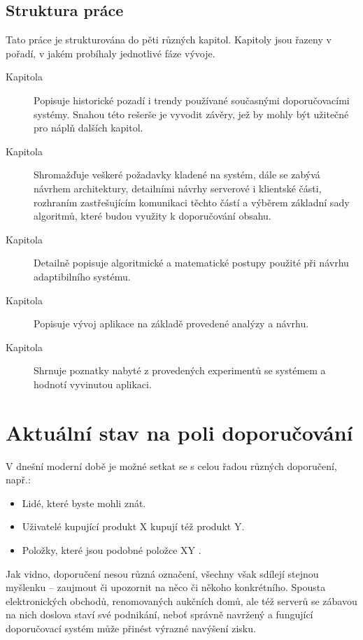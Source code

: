 \documentclass[thesis=M,czech]{FITthesis}[2014/05/07]
\begin{document}
\begin{introduction}
\section{Struktura práce}
\label{sec:structure}
	Tato práce je strukturována do pěti různých kapitol. Kapitoly jsou řazeny v pořadí, v jakém probíhaly jednotlivé fáze vývoje.	

\begin{description}
  \item[Kapitola ] Popisuje historické pozadí i trendy používané současnými doporučovacími systémy. Snahou této rešerše je vyvodit závěry, jež by mohly být užitečné pro náplň dalších kapitol.
  \item[Kapitola ] Shromažďuje veškeré požadavky kladené na systém, dále se zabývá návrhem architektury, detailními návrhy serverové i klientské části, rozhraním zastřešujícím komunikaci těchto částí a výběrem základní sady algoritmů, které budou využity k doporučování obsahu. 
  \item[Kapitola ] Detailně popisuje algoritmické a matematické postupy použité při návrhu adaptibilního systému. 
  \item[Kapitola ] Popisuje vývoj aplikace na základě provedené analýzy a návrhu.
  \item[Kapitola ] Shrnuje poznatky nabyté z provedených experimentů se systémem a hodnotí vyvinutou aplikaci. 
\end{description}
	
\end{introduction}
	
\chapter{Aktuální stav na poli doporučování}	
\label{chap:current}

V dnešní moderní době je možné setkat se s celou řadou různých doporučení, např.: 

\begin{itemize}
	\item Lidé, které byste mohli znát.
	\item Uživatelé kupující produkt X kupují též produkt Y.
	\item Položky, které jsou podobné položce XY	.
\end{itemize}

Jak vidno, doporučení nesou různá označení, všechny však sdílejí stejnou myšlenku – zaujmout či upozornit na něco či někoho konkrétního. Spousta elektronických obchodů, renomovaných aukčních domů, ale též serverů se zábavou na nich doslova staví své podnikání, neboť správně navržený a fungující doporučovací systém může přinést výrazné navýšení zisku. 
\end{document}
